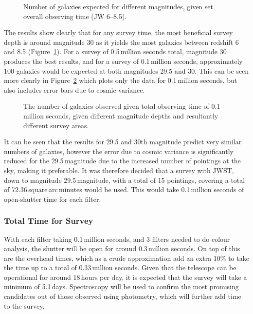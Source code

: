 		\clearpage
		\begin{figure}[htbp]
			\centering
				\begingroup{}
					\resizebox{0.8\textwidth}{!}{%
						
					}\endgroup
			\caption{Number of galaxies expected for different magnitudes, given set overall observing time (JW 6--8.5).\label{fig:galaxies_expected_JWST_68}}
		\end{figure}

		The results show clearly that for any survey time, the most beneficial survey depth is around magnitude 30 as it yields the most galaxies between redshift 6 and 8.5 (Figure~\ref{fig:galaxies_expected_JWST_68}). For a survey of 0.5\,million seconds total, magnitude 30 produces the best results, and for a survey of 0.1\,million seconds, approximately 100 galaxies would be expected at both magnitudes 29.5 and 30. This can be seen more clearly in Figure~\ref{fig:galaxies_expected_JWST_errors} which plots only the data for 0.1\,million seconds, but also includes error bars due to cosmic variance.
		\begin{figure}[htbp]
			\centering
				\begingroup{}
					\resizebox{0.8\textwidth}{!}{%
						
					}\endgroup
			\caption{The number of galaxies observed given total observing time of 0.1\,million seconds, given different magnitude depths and resultantly different survey areas.\label{fig:galaxies_expected_JWST_errors}}
		\end{figure}

		It can be seen that the results for 29.5 and 30th magnitude predict very similar numbers of galaxies, however the error due to cosmic variance is significantly reduced for the 29.5\,magnitude due to the increased number of pointings at the sky, making it preferable. It was therefore decided that a survey with JWST, down to magnitude 29.5\,magnitude, with a total of 15 pointings, covering a total of 72.36\,square\,arc\,minutes would be used. This would take 0.1\,million seconds of open-shutter time for each filter.

	\subsubsection{Total Time for Survey} %
	\label{sub:total_time_for_survey}
		With each filter taking 0.1\,million seconds, and 3 filters needed to do colour analysis, the shutter will be open for around 0.3\,million seconds. On top of this are the overhead times, which as a crude approximation add an extra 10\% to take the time up to a total of 0.33\,million seconds. Given that the telescope can be operational for around 18\,hours per day, it is expected that the survey will take a minimum of 5.1\,days. Spectroscopy will be used to confirm the most promising candidates out of those observed using photometry, which will further add time to the survey.
